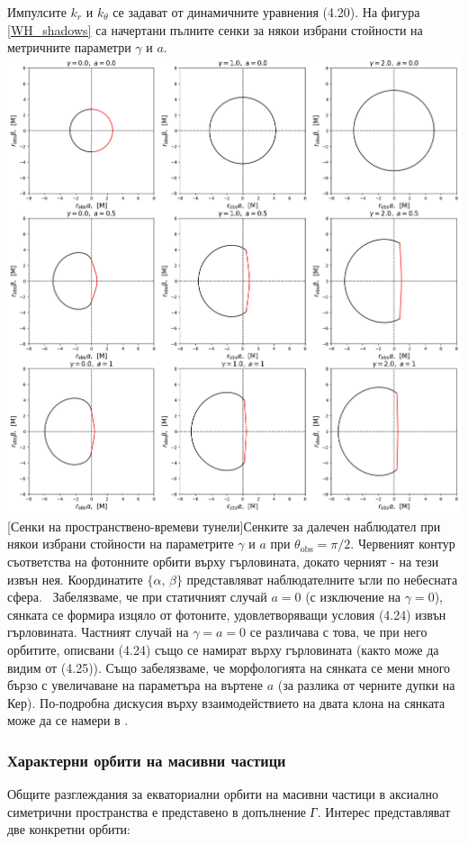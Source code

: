Импулсите $k_r$ и $k_\theta$ се задават от динамичните уравнения (4.20). На фигура \ref{WH_shadows} са начертани пълните сенки за някои избрани стойности на метричните параметри $\gamma$ и $a$.\\

\includegraphics[scale = 0.37]{WH_Shadows.png}
[Сенки на пространствено-времеви тунели]{\small Сенките за далечен наблюдател при някои избрани стойности на параметрите $\gamma$ и $a$ при $\theta_\text{obs} = \pi / 2$. Червеният контур съответства на фотонните орбити върху гърловината, докато черният - на тези извън нея. Координатите $\{\alpha,\,\beta\}$ представляват наблюдателните ъгли по небесната сфера.}
\label{WH_shadows}
$\,$
\newline
Забелязваме, че при статичният случай $a = 0$ (с изключение на $\gamma = 0$), сянката се формира изцяло от фотоните, удовлетворяващи условия (4.24) извън гърловината. Частният случай на $\gamma = a = 0$ се различава с това, че при него орбитите, описвани (4.24) също се намират върху гърловината (както може да видим от (4.25)). Също забелязваме, че морфологията на сянката се мени много бързо с увеличаване на параметъра на въртене $a$ (за разлика от черните дупки на Кер). По-подробна дискусия върху взаимодействието на двата клона на сянката може да се намери в \cite{Gyulchev2018}.
\newpage
\subsubsection{Характерни орбити на масивни частици}
Общите разглеждания за екваториални орбити на масивни частици в аксиално симетрични пространства е представено в допълнение \emph{Г}. Интерес представляват две конкретни орбити:\\

